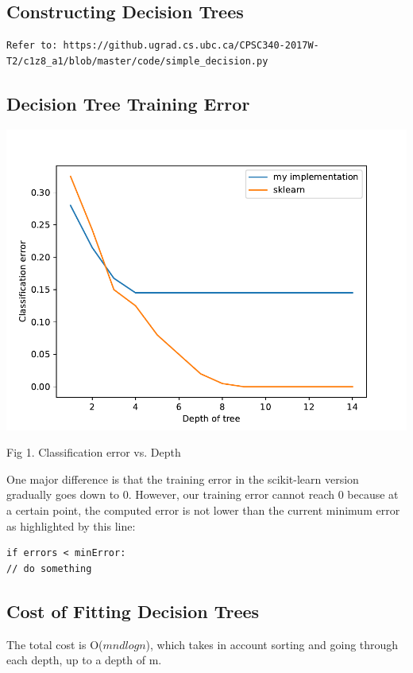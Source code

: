 \documentclass{article}
\begin{document}
\subsection{Constructing Decision Trees}
\begin{verbatim}
Refer to: https://github.ugrad.cs.ubc.ca/CPSC340-2017W-T2/c1z8_a1/blob/master/code/simple_decision.py
\end{verbatim}

\subsection{Decision Tree Training Error}

\includegraphics[scale=0.8]{../figs/q2_4_tree_errors}
\\ \centerline{Fig 1. Classification error vs. Depth}

One major difference is that the training error in the scikit-learn version gradually goes down to 0. However, our training error cannot reach 0 because at a certain point, the computed error is not lower than the current minimum error as highlighted by this line:
\begin{verbatim}
if errors < minError:
// do something
\end{verbatim}

\subsection{Cost of Fitting Decision Trees}

The total cost is O($mndlogn$), which takes in account sorting and going through each depth, up to a depth of m. 
\end{document}
